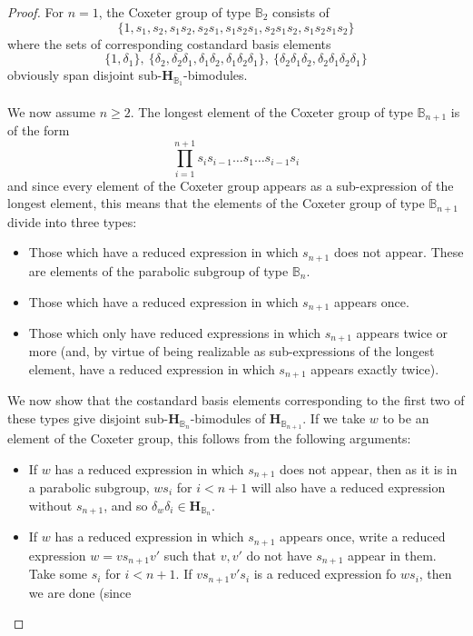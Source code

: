 \documentclass[11pt]{article}
\theoremstyle{definition}
\theoremstyle{remark}
\numberwithin{equation}{section}
\begin{document}
\begin{proof}
	For $n=1$, the Coxeter group of type $\mathbb{B}_2$ consists of
\[\{1,s_1,s_2,s_1s_2,s_2s_1,s_1s_2s_1,s_2s_1s_2,s_1s_2s_1s_2\}\]
where the sets of corresponding costandard basis elements
\[\{1,\delta_1\},\ \{\delta_2,\delta_2\delta_1,
\delta_1\delta_2,\delta_1\delta_2\delta_1\},\ \{\delta_2\delta_1\delta_2,
\delta_2\delta_1\delta_2\delta_1\}\]
obviously span disjoint sub-$\mathbf{H}_{\mathbb{B}_1}$-bimodules.
\\ \\
We now assume $n \geq 2$.
	The longest element of the Coxeter group of
	type $\mathbb{B}_{n+1}$ is of the form
	\[\prod_{i=1}^{n+1}s_is_{i-1}\dots s_1 \dots s_{i-1}s_i \]
	and since every element of the Coxeter group appears as a sub-expression of
	the longest element, this means that the elements of the Coxeter
	group of type $\mathbb{B}_{n+1}$ divide into three types:
	\begin{itemize}
	\item Those which have a reduced expression in which
		$s_{n+1}$ does not appear. These are elements of the
		parabolic subgroup of type $\mathbb{B}_n$.
	\item Those which have a reduced expression in which $s_{n+1}$ appears once.
	\item Those which only have reduced expressions in which $s_{n+1}$ appears
		twice or more (and, by virtue of being realizable as
		sub-expressions of the longest element, have a reduced expression
		in which $s_{n+1}$ appears exactly twice).
	\end{itemize}
	We now show that the
	costandard basis elements corresponding to the first two of these types
	give disjoint
	sub-$\mathbf{H}_{\mathbb{B}_n}$-bimodules of $\mathbf{H}_{\mathbb{B}_{n+1}}$.
	If we take $w$ to be an element of
	the Coxeter group, this follows from the following arguments:
	\begin{itemize}
		\item If $w$ has a reduced expression in which $s_{n+1}$ does
			not appear, then as it is in a parabolic subgroup,
			$ws_i$ for $i < n+1$ will also have a reduced expression
			without $s_{n+1}$, and so $\delta_w\delta_{i}\in
			\mathbf{H}_{\mathbb{B}_n}$.
		\item If $w$ has a reduced expression in which $s_{n+1}$
			appears once, write a
			reduced expression $w=vs_{n+1}v'$ such that
			$v,v'$ do not have $s_{n+1}$ appear in them. Take some
			$s_i$ for $i < n+1$. If $vs_{n+1}v's_i$ is a reduced
			expression fo $ws_i$, then we are done (since

\end{itemize}
\end{proof}
\end{document}
